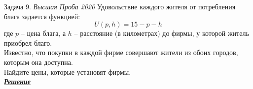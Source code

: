 \begin{mybox}{Задача 9. \textit{Высшая Проба 2020}}
    \indent\setlength{\parindent}{1em}Удовольствие каждого жителя от потребления блага задается функцией:
    $$U(p,h)=15-p-h$$
    \indent\setlength{\parindent}{1em}где $p$ – цена блага, а $h$ – расстояние (в километрах) до фирмы, у которой житель
    приобрел благо.\\
    \indent\setlength{\parindent}{1em}Известно, что покупки в каждой фирме совершают жители из обоих городов, которым
    она доступна.\\
    \indent\setlength{\parindent}{1em}Найдите цены, которые установят фирмы.\bigskip\\
    \textit{\textbf{\centering\href{https://iloveeconomics.ru/sites/default/files/olimp/proba/2020/proba_2020_2020_ekonomika_2_etap_10_klass_19909.docx}{Решение}}}
\end{mybox}

